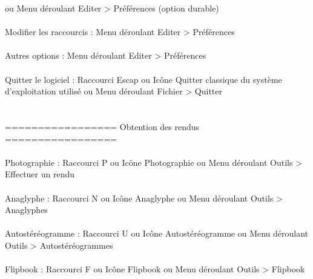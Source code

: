 	 	   			ou     Menu déroulant Editer > Préférences (option durable)
\\ \\
Modifier les raccourcis :		Menu déroulant Editer > Préférences
\\ \\
Autres options :			Menu déroulant Editer > Préférences
\\ \\
Quitter le logiciel :			Raccourci Escap
	   	    			ou Icône Quitter classique du système d'exploitation utilisé
					ou Menu déroulant Fichier > Quitter
\\ \\ \\
================= Obtention des rendus =================
\\ \\
Photographie :	  	    	        Raccourci P
	     				ou     Icône Photographie
					ou     Menu déroulant Outils > Effectuer un rendu
\\ \\
Anaglyphe :	  	    	        Raccourci N
	     				ou     Icône Anaglyphe
					ou     Menu déroulant Outils > Anaglyphes
\\ \\
Autostéréogramme :	  	    	Raccourci U
	     				ou     Icône Autostéréogramme
					ou     Menu déroulant Outils > Autostéréogrammes
\\ \\
Flipbook :	  	    	        Raccourci F
	     				ou     Icône Flipbook
					ou     Menu déroulant Outils > Flipbook
